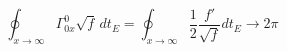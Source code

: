 \begin{equation}
   \oint_{x\to \infty} \Gamma^0_{0x}\sqrt{f}\, dt_E = \oint_{x\to \infty}\frac{1}{2} \frac{f'}{\sqrt{f}} dt_E
   \to 2\pi
   \end{equation}

